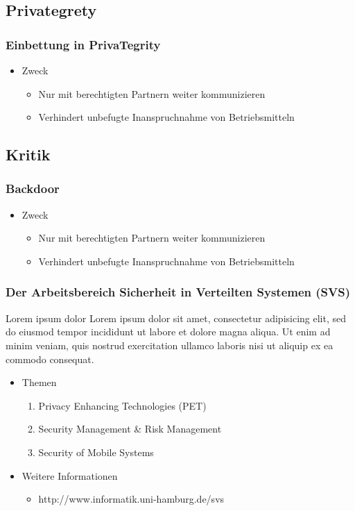 \documentclass[t, xcolor=dvipsnames]{beamer}
\begin{document}
\subsection{Privategrety}
\begin{frame}
	\frametitle{Einbettung in PrivaTegrity}
	\begin{itemize}
		\item Zweck
			\begin{itemize}
				\item Nur mit \alert{berechtigten Partnern} weiter kommunizieren
				\item Verhindert unbefugte Inanspruchnahme von Betriebsmitteln
			\end{itemize}
	\end{itemize}
	\vspace{\fill}
\end{frame}
\subsection{Kritik}\begin{frame}
	\frametitle{Backdoor}
	\begin{itemize}
		\item Zweck
			\begin{itemize}
				\item Nur mit \alert{berechtigten Partnern} weiter kommunizieren
				\item Verhindert unbefugte Inanspruchnahme von Betriebsmitteln
			\end{itemize}
	\end{itemize}
	\vspace{\fill}
\end{frame}


\begin{frame}
	\frametitle{Der Arbeitsbereich Sicherheit in Verteilten Systemen (SVS)}
	\begin{block}{Lorem ipsum dolor}
		Lorem ipsum dolor sit amet, consectetur adipisicing elit, sed do eiusmod tempor incididunt ut labore et dolore magna aliqua. Ut enim ad minim veniam, quis nostrud exercitation ullamco laboris nisi ut aliquip ex ea commodo consequat. 
	\end{block}
	\begin{itemize}
		\item Themen
			\begin{enumerate}
				\item Privacy Enhancing Technologies (PET)
				\item Security Management \& Risk Management
				\item Security of Mobile Systems
			\end{enumerate}
		\item Weitere Informationen
			\begin{itemize}
				\item http://www.informatik.uni-hamburg.de/svs
			\end{itemize}
	\end{itemize}
\end{frame}
\end{document}
